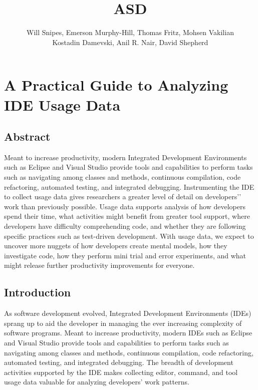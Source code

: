 \documentclass{book}
\begin{document}
\title{ASD}

\chapter{A Practical Guide to Analyzing IDE Usage Data\vspace{-0ex}}
\author{
Will Snipes, Emerson Murphy-Hill,
Thomas Fritz, Mohsen Vakilian \\
Kostadin Damevski,
Anil R. Nair, David Shepherd
}
\maketitle
\thispagestyle{empty}
\pagestyle{empty}
\begin{center}
\section*{Abstract}
\end{center}
Meant to increase productivity, modern Integrated Development Environments such as Eclipse and Visual Studio provide tools and capabilities to perform tasks such as navigating among classes and methods, continuous compilation, code refactoring, automated testing, and integrated debugging. 
Instrumenting the IDE to collect usage data gives researchers a greater level of detail on developers’' work than previously possible.  Usage data supports analysis of how developers spend their time, what activities might benefit from greater tool support, where developers have difficulty comprehending code, and whether they are following specific practices such as test-driven development.
With usage data, we expect to uncover more nuggets of how developers create mental models, how they investigate code, how they perform mini trial and error experiments, and what might release further productivity improvements for everyone.

\section{Introduction}
As software development evolved, Integrated Development Environments (IDEs) sprang up to aid the developer in managing the ever increasing complexity of software programs.  Meant to increase productivity, modern IDEs such as Eclipse and Visual Studio provide tools and capabilities to perform tasks such as navigating among classes and methods, continuous compilation, code refactoring, automated testing, and integrated debugging.  The breadth of development activities supported by the IDE makes collecting editor, command, and tool usage data valuable for analyzing developers' work patterns.  
\end{document}
